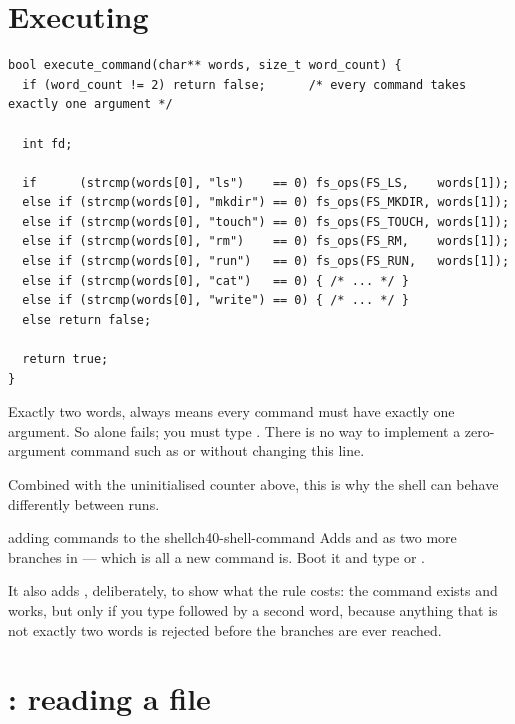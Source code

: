 \section{Executing}

\begin{lstlisting}[style=c]
bool execute_command(char** words, size_t word_count) {
  if (word_count != 2) return false;      /* every command takes exactly one argument */

  int fd;

  if      (strcmp(words[0], "ls")    == 0) fs_ops(FS_LS,    words[1]);
  else if (strcmp(words[0], "mkdir") == 0) fs_ops(FS_MKDIR, words[1]);
  else if (strcmp(words[0], "touch") == 0) fs_ops(FS_TOUCH, words[1]);
  else if (strcmp(words[0], "rm")    == 0) fs_ops(FS_RM,    words[1]);
  else if (strcmp(words[0], "run")   == 0) fs_ops(FS_RUN,   words[1]);
  else if (strcmp(words[0], "cat")   == 0) { /* ... */ }
  else if (strcmp(words[0], "write") == 0) { /* ... */ }
  else return false;

  return true;
}
\end{lstlisting}

\begin{warn}{Exactly two words, always}
 means every command must have exactly one argument. So
 alone fails; you must type . There is no way to implement a zero-argument command
such as  or  without changing this line.

Combined with the uninitialised counter above, this is why the shell can behave differently between
runs.
\end{warn}

\begin{recipe}{adding commands to the shell}{ch40-shell-command}
Adds  and  as two more branches in  --- which is all a new
command is. Boot it and type  or .

It also adds , deliberately, to show what the  rule costs: the
command exists and works, but only if you type  followed by a second word, because
anything that is not exactly two words is rejected before the branches are ever reached.
\end{recipe}

\section{: reading a file}

